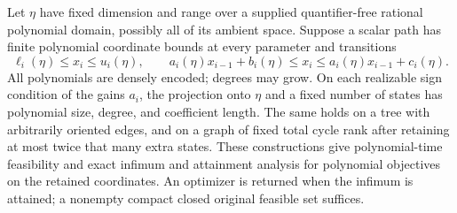 \begin{theorem}
\label{s5:strip}
Let $\eta$ have fixed dimension and range over a supplied
quantifier-free rational polynomial domain, possibly all of its ambient
space. Suppose a scalar path has finite polynomial coordinate bounds
at every parameter and transitions
\[
 \ell_i(\eta)\le x_i\le u_i(\eta),\qquad
 a_i(\eta)x_{i-1}+b_i(\eta)\le x_i
 \le a_i(\eta)x_{i-1}+c_i(\eta).
\]
All polynomials are densely encoded; degrees may grow. On each realizable
sign condition of the gains $a_i$, the projection onto $\eta$ and a fixed
number of states has polynomial size, degree, and coefficient length.
The same holds on a tree with arbitrarily oriented edges, and on a graph
of fixed total cycle rank after retaining at most twice that many extra
states. These constructions give polynomial-time feasibility and exact
infimum and attainment analysis for polynomial objectives on the
retained coordinates. An optimizer is returned when the infimum is
attained; a nonempty compact closed original feasible set suffices.
\end{theorem}
